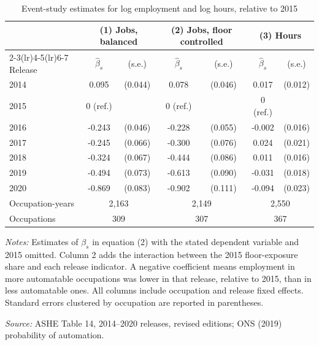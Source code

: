 \begin{table}[!ht]\centering
\caption{Event-study estimates for log employment and log hours, relative to 2015}\label{tab:esjobs}
\begin{threeparttable}\footnotesize\setlength{\tabcolsep}{4pt}
\begin{tabular}{lcccccc}\toprule
 & \multicolumn{2}{c}{(1) Jobs, balanced} & \multicolumn{2}{c}{(2) Jobs, floor controlled} & \multicolumn{2}{c}{(3) Hours} \\
\cmidrule(lr){2-3}\cmidrule(lr){4-5}\cmidrule(lr){6-7}
Release & $\hat{\beta}_{s}$ & (s.e.) & $\hat{\beta}_{s}$ & (s.e.) & $\hat{\beta}_{s}$ & (s.e.) \\ \midrule
2014 & 0.095 & (0.044) & 0.078 & (0.046) & 0.017 & (0.012) \\
2015 & 0 (ref.) &  & 0 (ref.) &  & 0 (ref.) &  \\
2016 & -0.243 & (0.046) & -0.228 & (0.055) & -0.002 & (0.016) \\
2017 & -0.245 & (0.066) & -0.300 & (0.076) & 0.024 & (0.021) \\
2018 & -0.324 & (0.067) & -0.444 & (0.086) & 0.011 & (0.016) \\
2019 & -0.494 & (0.073) & -0.613 & (0.090) & -0.031 & (0.018) \\
2020 & -0.869 & (0.083) & -0.902 & (0.111) & -0.094 & (0.023) \\
\addlinespace
Occupation-years & \multicolumn{2}{c}{2,163} & \multicolumn{2}{c}{2,149} & \multicolumn{2}{c}{2,550} \\
Occupations & \multicolumn{2}{c}{309} & \multicolumn{2}{c}{307} & \multicolumn{2}{c}{367} \\
\bottomrule\end{tabular}
\begin{tablenotes}\footnotesize
\item \emph{Notes:} Estimates of $\beta_{s}$ in equation (2) with the stated dependent variable and 2015 omitted. Column 2 adds the interaction between the 2015 floor-exposure share and each release indicator. A negative coefficient means employment in more automatable occupations was lower in that release, relative to 2015, than in less automatable ones. All columns include occupation and release fixed effects. Standard errors clustered by occupation are reported in parentheses.
\item \emph{Source:} ASHE Table 14, 2014--2020 releases, revised editions; ONS (2019) probability of automation.
\end{tablenotes}\end{threeparttable}\end{table}